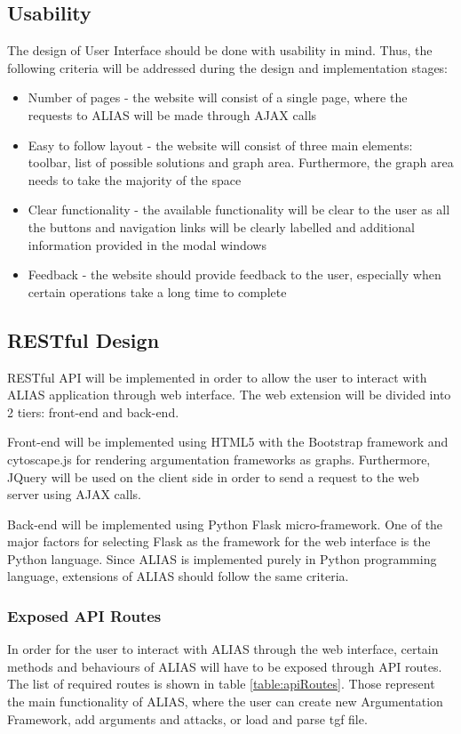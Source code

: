 \subsection{Usability}
The design of User Interface should be done with usability in mind. Thus, the following criteria will be addressed during the design and implementation stages:
\begin{itemize}
	\item Number of pages - the website will consist of a single page, where the requests to ALIAS will be made through AJAX calls
	\item Easy to follow layout - the website will consist of three main elements: toolbar, list of possible solutions and graph area. Furthermore, the graph area needs to take the majority of the space
	\item Clear functionality - the available functionality will be clear to the user as all the buttons and navigation links will be clearly labelled and additional information provided in the modal windows
	\item Feedback - the website should provide feedback to the user, especially when certain operations take a long time to complete
\end{itemize}

\subsection{RESTful Design}
RESTful API will be implemented in order to allow the user to interact with ALIAS application through web interface. The web extension will be divided into 2 tiers: front-end and back-end. 

Front-end will be implemented using HTML5 with the Bootstrap framework and cytoscape.js \citep{cytoscapejs} for rendering argumentation frameworks as graphs. Furthermore, JQuery will be used on the client side in order to send a request to the web server using AJAX calls.

Back-end will be implemented using Python Flask \citep{flaskDocs} micro-framework. One of the major factors for selecting Flask as the framework for the web interface is the Python language. Since ALIAS is implemented purely in Python programming language, extensions of ALIAS should follow the same criteria. 

\subsubsection{Exposed API Routes} 
In order for the user to interact with ALIAS through the web interface, certain methods and behaviours of ALIAS will have to be exposed through API routes. The list of required routes is shown in table \ref{table:apiRoutes}. Those represent the main functionality of ALIAS, where the user can create new Argumentation Framework, add arguments and attacks, or load and parse tgf file.


